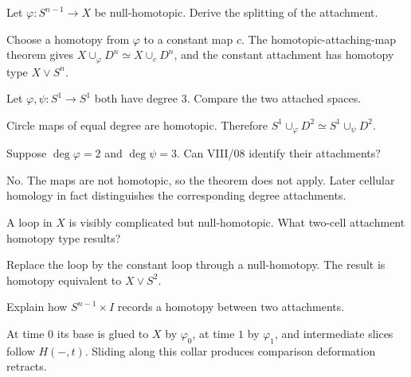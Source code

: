 \begin{problem}\label{prob:viii08-01}
Let \(\varphi:S^{n-1}\to X\) be null-homotopic.  Derive the splitting of the attachment.
\end{problem}
\begin{solution}
Choose a homotopy from \(\varphi\) to a constant map \(c\).  The homotopic-attaching-map theorem gives \(X\cup_\varphi D^n\simeq X\cup_cD^n\), and the constant attachment has homotopy type \(X\vee S^n\).
\end{solution}

\begin{problem}\label{prob:viii08-02}
Let \(\varphi,\psi:S^1\to S^1\) both have degree \(3\). Compare the two attached spaces.
\end{problem}
\begin{solution}
Circle maps of equal degree are homotopic. Therefore \(S^1\cup_\varphi D^2\simeq S^1\cup_\psi D^2\).
\end{solution}

\begin{problem}\label{prob:viii08-03}
Suppose \(\deg\varphi=2\) and \(\deg\psi=3\). Can VIII/08 identify their attachments?
\end{problem}
\begin{solution}
No.  The maps are not homotopic, so the theorem does not apply.  Later cellular homology in fact distinguishes the corresponding degree attachments.
\end{solution}

\begin{problem}\label{prob:viii08-04}
A loop in \(X\) is visibly complicated but null-homotopic. What two-cell attachment homotopy type results?
\end{problem}
\begin{solution}
Replace the loop by the constant loop through a null-homotopy.  The result is homotopy equivalent to \(X\vee S^2\).
\end{solution}

\begin{problem}\label{prob:viii08-05}
Explain how \(S^{n-1}\times I\) records a homotopy between two attachments.
\end{problem}
\begin{solution}
At time \(0\) its base is glued to \(X\) by \(\varphi_0\), at time \(1\) by \(\varphi_1\), and intermediate slices follow \(H(-,t)\).  Sliding along this collar produces comparison deformation retracts.
\end{solution}

